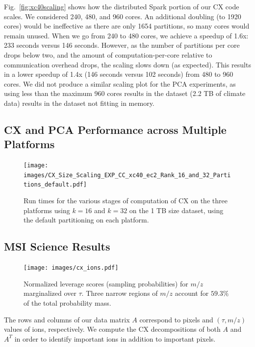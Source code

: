 Fig.~\ref{fig:xc40scaling} shows how the distributed Spark portion of our CX code scales.
We considered 240, 480, and 960 cores.  An additional doubling (to 1920 cores) would be ineffective as there are only 1654 partitions, 
so many cores would remain unused.  
When we go from 240 to 480 cores, we achieve a speedup of 1.6x:
233 seconds versus 146 seconds.  However, as the number of partitions per core drops 
below two, and the amount of computation-per-core relative to communication overhead drops, 
the scaling slows down (as expected).  
This results in a lower speedup of 1.4x (146 seconds versus 102
seconds) from 480 to 960 cores.
We did not produce a similar scaling plot for the PCA experiments, as using less
than the maximum 960 cores results in the dataset (2.2 TB of climate data)
results in the dataset not fitting in memory.

\subsection{CX and PCA Performance across Multiple Platforms}
  \label{sect:h2h}
    
    \begin{figure} [h!btp]
    \begin{centering}
      \texttt{[image: images/CX\_Size\_Scaling\_EXP\_CC\_xc40\_ec2\_Rank\_16\_and\_32\_Partitions\_default.pdf]}
    \end{centering}
    \caption{ Run times for the various stages of computation of CX on the three platforms using $k=16$ and $k=32$ on the 1 TB size dataset, using the default partitioning on each platform.} 
    \label{fig:h2hrank16} 
    \end{figure}

    
  

  \subsection{MSI Science Results}
  
  \begin{figure}[h!bt]
    \centering
    \texttt{[image: images/cx\_ions.pdf]}
      \caption{Normalized leverage scores (sampling probabilities) for $m/z$ marginalized over $\tau$.
        Three narrow regions of $m/z$ account for $59.3\%$ of the total probability mass.}
      \label{fig:cx_ions}
  \end{figure} 

  The rows and columns of our data matrix $A$ correspond to pixels and $(\tau, m/z)$ values of ions, respectively. 
  We compute the CX decompositions of both $A$ and $A^T$ in order to identify important ions in addition to important pixels.
   
